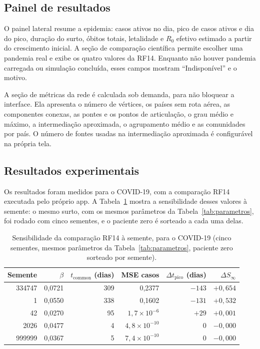 \documentclass[11pt]{article}
\begin{document}
\subsection{Painel de resultados}

O painel lateral resume a epidemia: casos ativos no dia, pico de casos ativos e dia do pico, duração do surto, óbitos totais, letalidade e $R_0$ efetivo estimado a partir do crescimento inicial. A seção de comparação científica permite escolher uma pandemia real e exibe os quatro valores da RF14. Enquanto não houver pandemia carregada ou simulação concluída, esses campos mostram ``Indisponível'' e o motivo.

A seção de métricas da rede é calculada sob demanda, para não bloquear a interface. Ela apresenta o número de vértices, os países sem rota aérea, as componentes conexas, as pontes e os pontos de articulação, o grau médio e máximo, a intermediação aproximada, o agrupamento médio e as comunidades por país. O número de fontes usadas na intermediação aproximada é configurável na própria tela.

\subsection{Resultados experimentais}

Os resultados foram medidos para o COVID-19, com a comparação RF14 executada pelo próprio app. A Tabela~\ref{tab:resultados} mostra a sensibilidade desses valores à semente: o mesmo surto, com os mesmos parâmetros da Tabela~\ref{tab:parametros}, foi rodado com cinco sementes, e o paciente zero é sorteado a cada uma delas.

\begin{table}[!ht]
\centering
\caption{Sensibilidade da comparação RF14 à semente, para o COVID-19 (cinco sementes, mesmos parâmetros da Tabela~\ref{tab:parametros}, paciente zero sorteado por semente).}
\label{tab:resultados}
\footnotesize
\begin{tabular}{rrrrrr}
\hline
\textbf{Semente} & \textbf{$\beta$} & \textbf{$t_{\text{common}}$ (dias)} & \textbf{MSE casos} & \textbf{$\Delta t_{\text{pico}}$ (dias)} & \textbf{$\Delta S_{\infty}$} \\
\hline
334747 & 0,0721 & 309 & 0,2377 & $-143$ & $+0,654$ \\
1      & 0,0550 & 338 & 0,1602 & $-131$ & $+0,532$ \\
42     & 0,0270 & 95  & $1{,}7\times10^{-6}$ & $+29$ & $+0,001$ \\
2026   & 0,0477 & 4   & $4{,}8\times10^{-10}$ & $0$ & $-0,000$ \\
999999 & 0,0367 & 5   & $7{,}4\times10^{-10}$ & $0$ & $-0,000$ \\
\hline
\end{tabular}
\end{table}
\end{document}
